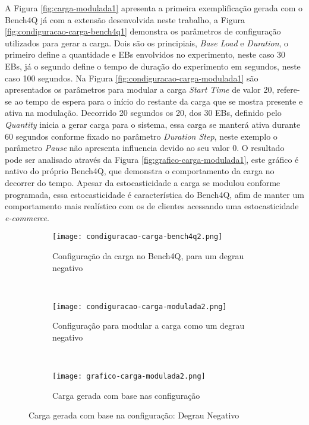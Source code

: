 A Figura \ref{fig:carga-modulada1} apresenta a primeira exemplificação gerada com o Bench4Q já com a extensão desenvolvida neste trabalho, a Figura \ref{fig:condiguracao-carga-bench4q1} demonstra os parâmetros de configuração utilizados para gerar a carga. Dois são os principiais, \textit{Base Load} e \textit{Duration}, o primeiro define a quantidade e EBs envolvidos no experimento, neste caso 30 EBs, já o segundo define o tempo de duração do experimento em segundos, neste caso 100 segundos. Na Figura \ref{fig:condiguracao-carga-modulada1} são apresentados os parâmetros para modular a carga \textit{Start Time} de valor 20, refere-se ao tempo de espera para o início do restante da carga que se mostra presente e ativa na modulação. Decorrido 20 segundos os 20, dos 30 EBs, definido pelo \textit{Quantity} inicia a gerar carga para o sistema, essa carga se manterá ativa durante 60 segundos conforme fixado no parâmetro \textit{Duration Step}, neste exemplo o parâmetro \textit{Pause} não apresenta influencia devido ao seu valor 0.
O resultado pode ser analisado através da Figura \ref{fig:grafico-carga-modulada1}, este gráfico é nativo do próprio Bench4Q, que demonstra o comportamento da carga no decorrer do tempo. Apesar da estocasticidade a carga se modulou conforme programada, essa estocasticidade é característica do Bench4Q, afim de manter um comportamento mais realístico com os de clientes acessando uma estocasticidade \textit{e-commerce}.

\begin{figure}[!htb]
	\begin{subfigure}{\linewidth}
		\centering
		\texttt{[image: condiguracao-carga-bench4q2.png]}
		\caption{Configuração da carga no Bench4Q, para um degrau negativo}
		\label{fig:condiguracao-carga-bench4q2}
	\end{subfigure}\\
	\begin{subfigure}{\linewidth}
		\centering
		\texttt{[image: condiguracao-carga-modulada2.png]}
		\caption{Configuração para modular a carga como um degrau negativo}
		\label{fig:condiguracao-carga-modulada2}
	\end{subfigure}\\[1ex]
	\begin{subfigure}{\linewidth}
		\centering
		\texttt{[image: grafico-carga-modulada2.png]}
		\caption{Carga gerada com base nas configuração}
		\label{fig:grafico-carga-modulada2}
	\end{subfigure}
	\caption{Carga gerada com base na configuração: Degrau Negativo}
	\label{fig:carga-modulada2}
	\fautor
\end{figure}


